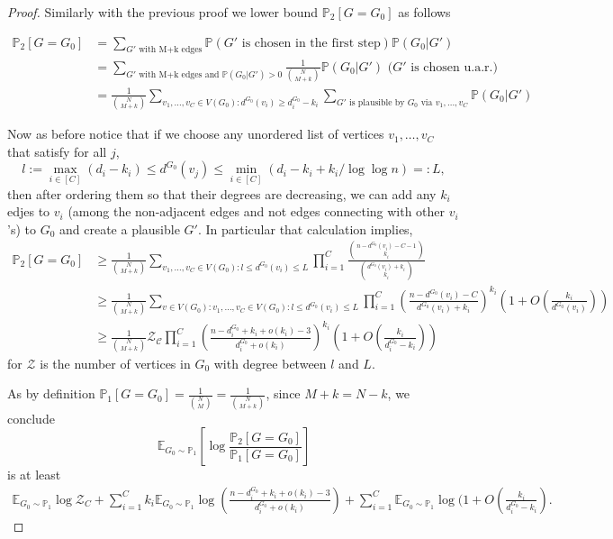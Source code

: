 \documentclass[12pt,a4paper]{article}
\numberwithin{equation}{section}
\numberwithin{equation}{section}
\newcommand{\1}{{\text{\Large $\mathfrak 1$}}}
\newcommand{\2}[1]{{\text{\Large $\mathfrak 1$}\!\left(#1\right)}}
\begin{document}
\begin{proof}
Similarly with the previous proof we lower bound $\mathbb{P}_2[G=G_0]$ as follows

\begin{align*}
\mathbb{P}_2[G=G_0]&=\sum_{G' \text{ with M+k edges}} \mathbb{P}(G' \text{ is chosen in the first step}) \mathbb{P}(G_0|G')\\
&=\sum_{G' \text{ with M+k edges and }\mathbb{P}(G_0|G')>0 } \frac{1}{\binom{N}{M+k}} \mathbb{P}(G_0|G') \text{ ($G'$ is chosen u.a.r.)}\\
&= \frac{1}{\binom{N}{M+k}} \sum_{v_1,\ldots,v_C \in V(G_0)  : d^{G_0}(v_i)  \geq d^{G_0}_i-k_i} \sum_{G' \text{ is plausible by } G_0 \text{ via } v_1,\ldots,v_C}\mathbb{P}(G_0|G')  \end{align*}

Now as before notice that if we choose any unordered list of vertices $v_1,\ldots,v_C$ that satisfy for all $j$, $$l:=\max_{i \in [C]} \left( d_i-k_i \right) \leq d^{G_0}(v_j) \leq \min_{i \in [C]} \left(d_i-k_i+k_i/\log \log n\right)=:L,$$ then after ordering them so that their degrees are decreasing, we can add any $k_i$ edjes to $v_i$ (among the non-adjacent edges and not edges connecting with other $v_i$'s) to $G_0$ and create a plausible $G'$. In particular that calculation implies,
\begin{align*}
\mathbb{P}_2[G=G_0]& \geq  \frac{1}{\binom{N}{M+k}} \sum_{v_1,\ldots,v_C \in V(G_0)  : l \leq  d^{G_0}(v_i) \leq L }  \prod_{i=1}^C \frac{\binom{n-d^{G_0}(v_i)-C-1}{k_i}}{\binom{d^{G_0}(v_i)+k_i}{k_i}} \\
&\geq   \frac{1}{\binom{N}{M+k}} \sum_{v \in V(G_0) : v_1,\ldots,v_C \in V(G_0)  : l \leq  d^{G_0}(v_i) \leq L } \prod_{i=1}^C \left(\frac{n-d^{G_0}(v_i)-C}{d^{G_0}(v_i)+k_i}\right)^{k_i}(1+O(\frac{k_i}{d^{G_0}(v_i)}))\\
&\geq   \frac{1}{\binom{N}{M+k}} \mathcal{Z_C} \prod_{i=1}^C \left(\frac{n-d^{G_0}_i+k_i+o(k_i)-3}{d^{G_0}_i+o(k_i)}\right)^{k_i}(1+O(\frac{k_i}{d^{G_0}_i-k_i}))
\end{align*} for $\mathcal{Z}$ is the number of vertices in $G_0$ with degree between $l$ and $L$. 

As by definition $\mathbb{P}_1[G=G_0]=\frac{1}{\binom{N}{M}}=\frac{1}{\binom{N}{M+k}}$, since $M+k=N-k$, we conclude 
$$\mathbb{E}_{G_0 \sim \mathbb{P}_1} \left[ \log \frac{\mathbb{P}_2[G=G_0]}{\mathbb{P}_1[G=G_0]}  \right]$$is at least
\begin{align*}\mathbb{E}_{G_0 \sim \mathbb{P}_1} \log \mathcal{Z}_C+\sum_{i=1}^Ck_i\mathbb{E}_{G_0 \sim \mathbb{P}_1}\log \left(\frac{n-d^{G_0}_i+k_i+o(k_i)-3}{d^{G_0}_i+o(k_i)}\right)+\sum_{i=1}^C\mathbb{E}_{G_0 \sim \mathbb{P}_1}\log (1+O(\frac{k_i}{d^{G_0}_i-k_i}).\end{align*} 



\end{proof}
\end{document}
